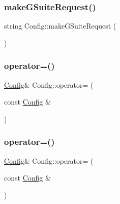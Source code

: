 \mbox{\label{class_config_a45dfcb0ab6def40b1ee15a0521a717ac}} 
\subsubsection{\texorpdfstring{make\+G\+Suite\+Request()}{makeGSuiteRequest()}\hspace{0.1cm}{\footnotesize\ttfamily [2/2]}}
{\footnotesize\ttfamily string Config\+::make\+G\+Suite\+Request (\begin{DoxyParamCaption}{ }\end{DoxyParamCaption})\hspace{0.3cm}{\ttfamily [private]}}

\mbox{\label{class_config_a301e8f32b1fad83bcab780bfa3fec1e9}} 
\subsubsection{\texorpdfstring{operator=()}{operator=()}\hspace{0.1cm}{\footnotesize\ttfamily [1/2]}}
{\footnotesize\ttfamily \hyperlink{class_config}{Config}\& Config\+::operator= (\begin{DoxyParamCaption}\item[{const \hyperlink{class_config}{Config} \&}]{ }\end{DoxyParamCaption})\hspace{0.3cm}{\ttfamily [private]}}

\mbox{\label{class_config_a301e8f32b1fad83bcab780bfa3fec1e9}} 
\subsubsection{\texorpdfstring{operator=()}{operator=()}\hspace{0.1cm}{\footnotesize\ttfamily [2/2]}}
{\footnotesize\ttfamily \hyperlink{class_config}{Config}\& Config\+::operator= (\begin{DoxyParamCaption}\item[{const \hyperlink{class_config}{Config} \&}]{ }\end{DoxyParamCaption})\hspace{0.3cm}{\ttfamily [private]}}

